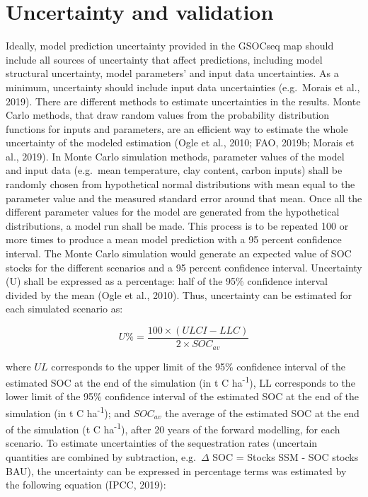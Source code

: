 \documentclass[
  10pt,
  b5paper,
]{book}
\begin{document}
\hypertarget{uncertainty-and-validation}{%
\chapter{\textbar{} Uncertainty and validation}\label{uncertainty-and-validation}}

Ideally, model prediction uncertainty provided in the GSOCseq map should include all sources of uncertainty that affect predictions, including model structural uncertainty, model parameters' and input data uncertainties. As a minimum, uncertainty should include input data uncertainties (e.g.~Morais et al., 2019).
There are different methods to estimate uncertainties in the results. Monte Carlo methods, that draw random values from the probability distribution functions for inputs and parameters, are an efficient way to estimate the whole uncertainty of the modeled estimation (Ogle et al., 2010; FAO, 2019b; Morais et al., 2019). In Monte Carlo simulation methods, parameter values of the model and input data (e.g.~mean temperature, clay content, carbon inputs) shall be randomly chosen from hypothetical normal distributions with mean equal to the parameter value and the measured standard error around that mean. Once all the different parameter values for the model are generated from the hypothetical distributions, a model run shall be made. This process is to be repeated 100 or more times to produce a mean model prediction with a 95 percent confidence interval. The Monte Carlo simulation would generate an expected value of SOC stocks for the different scenarios and a 95 percent confidence interval.
Uncertainty (U) shall be expressed as a percentage: half of the 95\% confidence interval divided by the mean (Ogle et al., 2010). Thus, uncertainty can be estimated for each simulated scenario as:

\begin{equation}
\tag{12.1}
U \% = \frac{100 \times (ULCI-LLC)}{2 \times SOC_{av}}
\end{equation}

where \(UL\) corresponds to the upper limit of the 95\% confidence interval of the estimated SOC at the end of the simulation (in t C ha\textsuperscript{-1}), LL corresponds to the lower limit of the 95\% confidence interval of the estimated SOC at the end of the simulation (in t C ha\textsuperscript{-1}); and \(SOC_{av}\) the average of the estimated SOC at the end of the simulation (t C ha\textsuperscript{-1}), after 20 years of the forward modelling, for each scenario.
To estimate uncertainties of the sequestration rates (uncertain quantities are combined by subtraction, e.g.~\(\Delta\) SOC = Stocks SSM - SOC stocks BAU), the uncertainty can be expressed in percentage terms was estimated by the following equation (IPCC, 2019):
\end{document}
